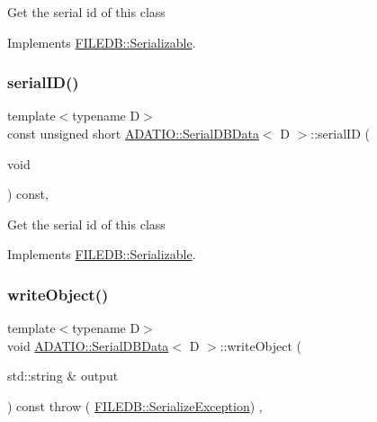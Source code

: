 Get the serial id of this class 

Implements \mbox{\hyperlink{classFILEDB_1_1Serializable_a5d639b5dbd5d8ebc7dca1eca31bbc868}{F\+I\+L\+E\+D\+B\+::\+Serializable}}.

\mbox{\label{classADATIO_1_1SerialDBData_a513643be38434a570d655602330aade9}} 
\subsubsection{\texorpdfstring{serialID()}{serialID()}\hspace{0.1cm}{\footnotesize\ttfamily [3/3]}}
{\footnotesize\ttfamily template$<$typename D$>$ \\
const unsigned short \mbox{\hyperlink{classADATIO_1_1SerialDBData}{A\+D\+A\+T\+I\+O\+::\+Serial\+D\+B\+Data}}$<$ D $>$\+::serial\+ID (\begin{DoxyParamCaption}\item[{void}]{ }\end{DoxyParamCaption}) const\hspace{0.3cm}{\ttfamily [inline]}, {\ttfamily [virtual]}}

Get the serial id of this class 

Implements \mbox{\hyperlink{classFILEDB_1_1Serializable_a5d639b5dbd5d8ebc7dca1eca31bbc868}{F\+I\+L\+E\+D\+B\+::\+Serializable}}.

\mbox{\label{classADATIO_1_1SerialDBData_a5266e4f1c065f0776f9974d6fad51a2f}} 
\subsubsection{\texorpdfstring{writeObject()}{writeObject()}\hspace{0.1cm}{\footnotesize\ttfamily [1/3]}}
{\footnotesize\ttfamily template$<$typename D$>$ \\
void \mbox{\hyperlink{classADATIO_1_1SerialDBData}{A\+D\+A\+T\+I\+O\+::\+Serial\+D\+B\+Data}}$<$ D $>$\+::write\+Object (\begin{DoxyParamCaption}\item[{std\+::string \&}]{output }\end{DoxyParamCaption}) const throw ( \mbox{\hyperlink{classFILEDB_1_1SerializeException}{F\+I\+L\+E\+D\+B\+::\+Serialize\+Exception}}) \hspace{0.3cm}{\ttfamily [inline]}, {\ttfamily [virtual]}}

